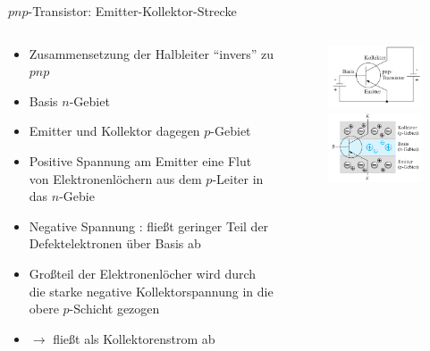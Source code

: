 \documentclass[12pt%
,aspectratio=169%
]{beamer}
\begin{document}
\begin{frame}{$pnp$-Transistor: Emitter-Kollektor-Strecke}
\begin{columns}[T] %
\begin{column}{.58\textwidth}
	\begin{itemize}
		\item Zusammensetzung der Halbleiter \enquote{invers} zu $pnp$
		\item Basis $n$-Gebiet
		\item Emitter und Kollektor dagegen $p$-Gebiet
		\item Positive Spannung am Emitter eine Flut von Elektronenlöchern aus dem $p$-Leiter in das $n$-Gebie
		\item Negative Spannung	: fließt geringer Teil der Defektelektronen über Basis ab
		\item Großteil der Elektronenlöcher wird durch die starke negative Kollektorspannung in die obere $p$-Schicht gezogen
		\item $\to$ fließt als Kollektorenstrom ab
	\end{itemize}
\end{column}%
\hfill%
\begin{column}{.38\textwidth}
\begin{figure}
\center
\includegraphics[scale=0.4]{pictures/pnp_schema}\\
\includegraphics[scale=0.4]{pictures/pnp_aufbau}
\end{figure}
\end{column}%
\end{columns}
\end{frame}
\end{document}
